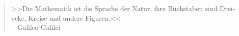 \null\vfil
\begin{otherlanguage}{ngerman}
\begin{center}\textsf{\textbf{\abstractname}}\end{center}


    \begin{quote}
        \textcolor{rot5}{>>Die Mathematik ist die Sprache der Natur, 
        ihre Buchstaben sind Dreiecke, Kreise und andere Figuren.<<}\\ 
        \raggedleft \small{-- Galileo Galilei}%
    \end{quote}

\end{otherlanguage}
\vfil\null



